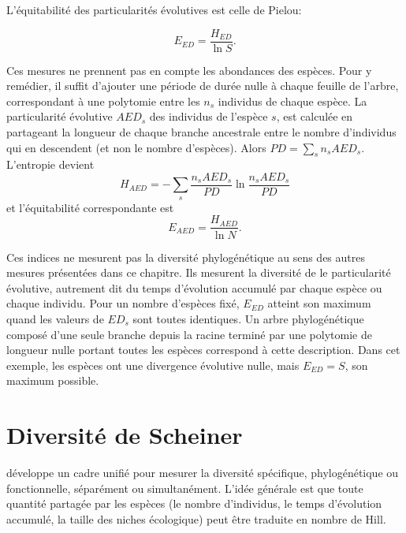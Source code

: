 \documentclass[
  11pt,
  french,
  a4paper,
  extrafontsizes,onecolumn,openright
  ]{memoir}
\begin{document}
L'équitabilité des particularités évolutives est celle de Pielou:

\begin{equation}
  \label{eq:EED}
  E_{\mathit{ED}} = \frac{H_{\mathit{ED}}}{\ln{S}}.
\end{equation}

Ces mesures ne prennent pas en compte les abondances des espèces.
Pour y remédier, il suffit d'ajouter une période de durée nulle à chaque feuille de l'arbre, correspondant à une polytomie entre les \(n_s\) individus de chaque espèce.
La particularité évolutive \(\mathit{AED}_s\) des individus de l'espèce \(s\), est calculée en partageant la longueur de chaque branche ancestrale entre le nombre d'individus qui en descendent (et non le nombre d'espèces).
Alors \(\mathit{PD} = \sum_s{n_s \mathit{AED}_s}\).
L'entropie devient
\begin{equation}
  \label{eq:HAED}
  H_{\mathit{AED}} = -\sum_s{\frac{n_s \mathit{AED}_s}{\mathit{PD}} \ln\frac{n_s \mathit{AED}_s}{\mathit{PD}}}
\end{equation}
et l'équitabilité correspondante est
\begin{equation}
  \label{eq:EAED}
  E_{\mathit{AED}} = \frac{H_{\mathit{AED}}}{\ln{N}}.
\end{equation}

Ces indices ne mesurent pas la diversité phylogénétique au sens des autres mesures présentées dans ce chapitre.
Ils mesurent la diversité de le particularité évolutive, autrement dit du temps d'évolution accumulé par chaque espèce ou chaque individu.
Pour un nombre d'espèces fixé, \(E_{\mathit{ED}}\) atteint son maximum quand les valeurs de \(\mathit{ED}_s\) sont toutes identiques.
Un arbre phylogénétique composé d'une seule branche depuis la racine terminé par une polytomie de longueur nulle portant toutes les espèces correspond à cette description.
Dans cet exemple, les espèces ont une divergence évolutive nulle, mais \(E_{\mathit{ED}} = S\), son maximum possible.

\section{Diversité de Scheiner}\label{diversituxe9-de-scheiner}

\textcite{Scheiner2012} développe un cadre unifié pour mesurer la diversité spécifique, phylogénétique ou fonctionnelle, séparément ou simultanément.
L'idée générale est que toute quantité partagée par les espèces (le nombre d'individus, le temps d'évolution accumulé, la taille des niches écologique) peut être traduite en nombre de Hill.
\end{document}
